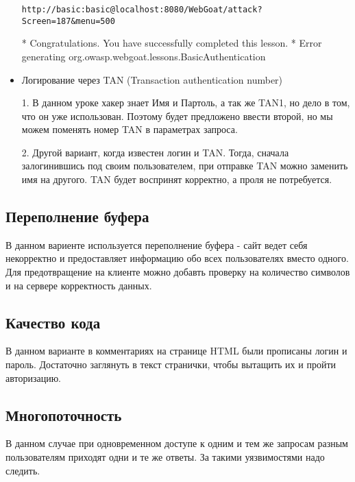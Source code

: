 \documentclass[11pt, a4paper]{article}		%
\begin{document}
\begin{itemize}
\verb'http://basic:basic@localhost:8080/WebGoat/attack?Screen=187&menu=500'
 
* Congratulations. You have successfully completed this lesson.
* Error generating org.owasp.webgoat.lessons.BasicAuthentication


\item Логирование через TAN (Transaction authentication number)

1. В данном уроке хакер знает Имя и Партоль, а так же TAN1, но дело в том, что он уже использован. Поэтому будет предложено ввести второй, но мы можем поменять номер TAN в параметрах запроса.

2. Другой вариант, когда известен логин и TAN. Тогда, сначала залогинившись под своим пользователем, при отправке TAN можно заменить имя на другого. TAN будет воспринят корректно, а проля не потребуется.

\end{itemize}



\subsection{Переполнение буфера}

В данном вариенте используется переполнение буфера - сайт ведет себя некорректно и предоставляет информацию обо всех пользователях вместо одного. 
Для предотвращение на клиенте можно добавть проверку на количество символов и на сервере корректность данных.


\subsection{Качество кода}

В данном варианте в комментариях на странице HTML были прописаны логин и пароль. Достаточно заглянуть в текст странички, чтобы вытащить их и пройти авторизацию.


\subsection{Многопоточность}

В данном случае при одновременном доступе к одним и тем же запросам разным пользователям приходят одни и те же ответы. За такими уязвимостями надо следить.
\end{document}
